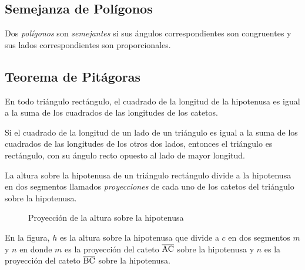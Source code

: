\subsection{Semejanza de Polígonos}

\begin{definition}
    Dos \textit{polígonos} son \textit{semejantes} si sus ángulos correspondientes son congruentes y sus lados correspondientes son proporcionales.
\end{definition}


\subsection{Teorema de Pitágoras}

\begin{theorem}
    En todo triángulo rectángulo, el cuadrado de la longitud de la hipotenusa es igual a la suma de los cuadrados de las longitudes de los catetos.
\end{theorem}

\begin{theorem}
    Si el cuadrado de la longitud de un lado de un triángulo es igual a la suma de los cuadrados de las longitudes de los otros dos lados, entonces el triángulo es rectángulo, con su ángulo recto opuesto al lado de mayor longitud.
\end{theorem}

\begin{definition}

    La altura sobre la hipotenusa de un triángulo rectángulo divide a la hipotenusa en dos segmentos llamados \textit{proyecciones} de cada uno de los catetos del triángulo sobre la hipotenusa.

    \begin{figure}[!h]
        \centering
        
        \caption{Proyección de la altura sobre la hipotenusa}
        \label{fig:proyec-altura-hipotenusa}
    \end{figure}    

    En la figura, $h$ es la altura sobre la hipotenusa que divide a $c$ en dos segmentos $m$ y $n$ en donde $m$ es la proyección del cateto $\overline{\rm AC}$ sobre la hipotenusa y $n$ es la proyección del cateto $\overline{\rm BC}$ sobre la hipotenusa.
\end{definition}

